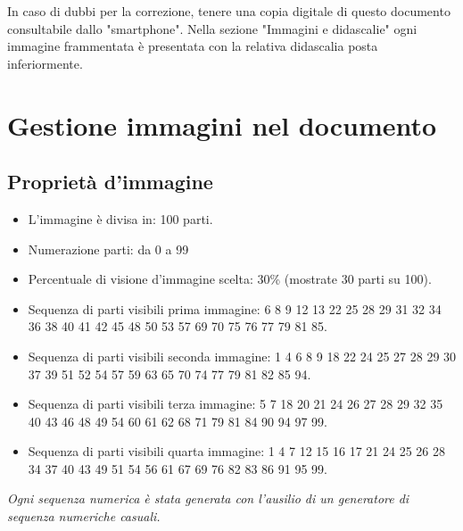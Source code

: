\documentclass[hidelinks,12pt,a4paper]{article}
\begin{document}
	
	\vspace*{\fill}
	\centering
	\fboxrule=2pt
	\fbox
	{
		\begin{minipage}{\linewidth}
			In caso di dubbi per la correzione, tenere una copia digitale di questo documento consultabile dallo "smartphone". Nella sezione "Immagini e didascalie" ogni immagine frammentata è presentata con la relativa didascalia posta inferiormente.
		\end{minipage}
	}

	\newpage
	\section{Gestione immagini nel documento}
	
	\newline
	
	\subsection{Proprietà d'immagine}
	\begin{itemize}
		\item L'immagine è divisa in: 100 parti.
		\item Numerazione parti: da 0 a 99
		\item Percentuale di visione d'immagine scelta: 30\% (mostrate 30 parti su 100).
		\item Sequenza di parti visibili prima immagine:  6 8 9 12 13 22 25 28 29 31 32 34 36 38 40 41 42 45 48 50 53 57 69 70 75 76 77 79 81 85.
		\item Sequenza di parti visibili seconda immagine:  1 4 6 8 9 18 22 24 25 27 28 29 30 37 39 51 52 54 57 59 63 65 70 74 77 79 81 82 85 94.
		\item Sequenza di parti visibili terza immagine:  5 7 18 20 21 24 26 27 28 29 32 35 40 43 46 48 49 54 60 61 62 68 71 79 81 84 90 94 97 99.
		\item Sequenza di parti visibili quarta immagine:  1 4 7 12 15 16 17	21 24 25 26 28 34 37 40 43 49 51 54 56 61 67 69 76 82 83 86 91 95 99.
	\end{itemize}
	\textit{Ogni sequenza numerica è stata generata con l'ausilio di un generatore di sequenza numeriche casuali.}
\end{document}
